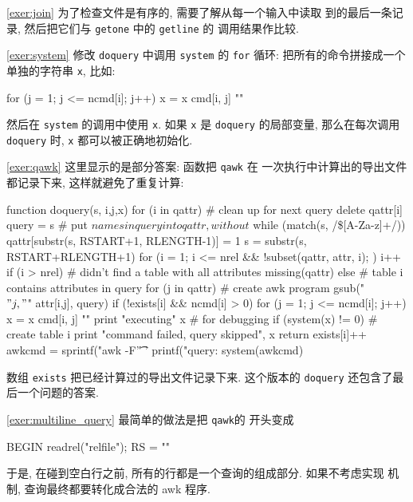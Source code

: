 \myexer\ref{exer:join} 为了检查文件是有序的, 需要了解从每一个输入中读取
到的最后一条记录, 然后把它们与 \texttt{getone} 中的 \texttt{getline} 的
调用结果作比较.

\myexer\ref{exer:system} 修改 \texttt{doquery} 中调用 \texttt{system}
的 \texttt{for} 循环: 把所有的命令拼接成一个单独的字符串 \texttt{x},
比如:
\begin{awkcode}
    for (j = 1; j <= ncmd[i]; j++) x = x cmd[i, j] "\n"
\end{awkcode}
然后在 \texttt{system} 的调用中使用 \texttt{x}. 如果 \texttt{x} 是 
\texttt{doquery} 的局部变量, 那么在每次调用 \texttt{doquery} 时, 
\texttt{x} 都可以被正确地初始化.

\myexer\ref{exer:qawk} 这里显示的是部分答案: 函数把 \texttt{qawk} 在
一次执行中计算出的导出文件都记录下来, 这样就避免了重复计算:
\begin{awkcode}
    function doquery(s,   i,j,x) {
        for (i in qattr)  # clean up for next query
            delete qattr[i]
        query = s    # put $names in query into qattr, without $
        while (match(s, /\$[A-Za-z]+/)) {
            qattr[substr(s, RSTART+1, RLENGTH-1)] = 1
            s = substr(s, RSTART+RLENGTH+1)
        }
        for (i = 1; i <= nrel && !subset(qattr, attr, i); ) 
            i++
        if (i > nrel)     # didn't find a table with all attributes
            missing(qattr)
        else {            # table i contains attributes in query
            for (j in qattr)   # create awk program
                gsub("\\$" j, "$" attr[i,j], query)
            if (!exists[i] && ncmd[i] > 0) {
                for (j = 1; j <= ncmd[i]; j++)
                    x = x cmd[i, j] "\n"
                print "executing\n" x  # for debugging
                if (system(x) != 0) { # create table i
                        print "command failed, query skipped\n", x
                        return
                   }
                exists[i]++
            }
            awkcmd = sprintf("awk -F'\t' '%
            printf("query: %
            system(awkcmd)
        }
    }
\end{awkcode}
数组 \texttt{exists} 把已经计算过的导出文件记录下来. 这个版本的
\texttt{doquery} 还包含了最后一个问题的答案.

\myexer\ref{exer:multiline_query} 最简单的做法是把 \texttt{qawk}的
开头变成 
\begin{awkcode}
    BEGIN { readrel("relfile"); RS = "" }
\end{awkcode}
于是, 在碰到空白行之前, 所有的行都是一个查询的组成部分. 如果不考虑实现
机制, 查询最终都要转化成合法的 awk 程序.

